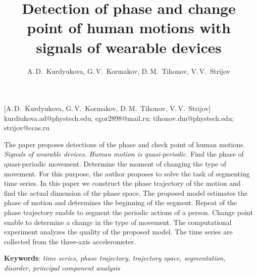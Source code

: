 \documentclass[12pt, twoside]{article}
\theoremstyle{definition}
\begin{document}
\title
    [] %
    {Detection of phase and change point of human motions with signals of wearable devices}
\author
    [A.\,D.~Kurdyukova] %
    {A.\,D.~Kurdyukova, G.\,V.~Kormakov, D.\,M.~Tihonov, V.\,V.~Strijov} %
    [A.\,D.~Kurdyukova, G.\,V.~Kormakov, D.\,M.~Tihonov, V.\,V.~Strijov] %
\email
  {kurdiukova.ad@phystech.edu; egor2898@mail.ru; tihonov.dm@phystech.edu;  strijov@ccas.ru}
\abstract
  {The paper proposes detections of the phase and check point of human motions. \emph{Signals of wearable devices. Human motion is quasi-periodic.} Find the phase of quasi-periodic movement. Determine the moment of changing the type of movement. For this purpose, the author proposes to solve the task of segmenting time series. In this paper we construct the phase trajectory of the motion and find the actual dimension of the phase space. The proposed model estimates the phase of motion and determines the beginning of the segment. Repeat of the phase trajectory enable to segment the periodic actions of a person. Change point enable to determine a change in the type of movement. The computational experiment analyzes the quality of the proposed model. The time series are collected from the three-axis accelerometer.

\bigskip
\noindent
\textbf{Keywords}: \emph {time series, phase trajectory, trajectory space, segmentation, disorder, principal component analysis}
}

\doi{}
\receivedRus{}
\receivedEng{}

\maketitle
\linenumbers

\newpage
\end{document}
